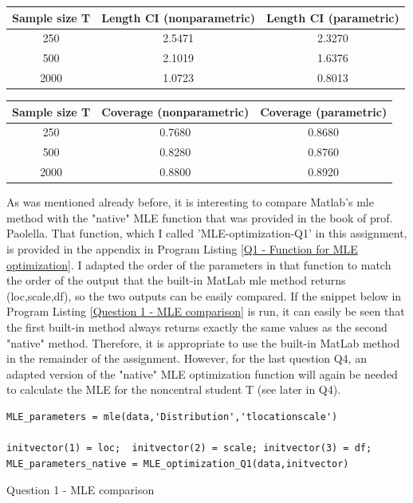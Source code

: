 \documentclass[12pt]{article}
\begin{document}
\begin{center}
\begin{tabular}{||c | c c||} 
 \hline
 Sample size T & Length CI (nonparametric) & Length CI (parametric) \\ [0.5ex] 
 \hline\hline
 250 & 2.5471 & 2.3270 \\ 
 \hline
 500 & 2.1019 & 1.6376 \\
 \hline
 2000 & 1.0723 & 0.8013 \\ [1ex] 
 \hline
\end{tabular}
\end{center}
\vspace{3pt}
\begin{center}
\begin{tabular}{||c | c c||} 
 \hline
 Sample size T & Coverage (nonparametric) & Coverage (parametric) \\ [0.5ex] 
 \hline\hline
 250 & 0.7680 & 0.8680 \\ 
 \hline
 500 & 0.8280 & 0.8760 \\
 \hline
 2000 & 0.8800 & 0.8920 \\ [1ex] 
 \hline
\end{tabular}
\end{center}
\vspace{15pt}


As was mentioned already before, it is interesting to compare Matlab's mle method with the "native" MLE function that was provided in the book of prof. Paolella. That function, which I called 'MLE-optimization-Q1' in this assignment, is provided in the appendix in Program Listing \ref{Q1 - Function for MLE optimization}. I adapted the order of the parameters in that function to match the order of the output that the built-in MatLab mle method returns (loc,scale,df), so the two outputs can be easily compared. \newline If the snippet below in Program Listing \ref{Question 1 - MLE comparison} is run, it can easily be seen that the first built-in method always returns exactly the same values as the second "native" method. Therefore, it is appropriate to use the built-in MatLab method in the remainder of the assignment. However, for the last question Q4, an adapted version of the "native" MLE optimization function will again be needed to calculate the MLE for the noncentral student T (see later in Q4). 

\begin{Program}[!htb]
\begin{lstlisting}[style=Matlab-editor,basicstyle=\mlttfamily\footnotesize]
MLE_parameters = mle(data,'Distribution','tlocationscale')

initvector(1) = loc;  initvector(2) = scale; initvector(3) = df; 
MLE_parameters_native = MLE_optimization_Q1(data,initvector)
\end{lstlisting}
\caption{Question 1 - MLE comparison}
\label{Question 1 - MLE comparison}
\end{Program}
\end{document}
